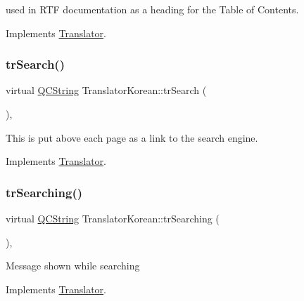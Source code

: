 used in R\+TF documentation as a heading for the Table of Contents. 

Implements \mbox{\hyperlink{class_translator}{Translator}}.

\mbox{\label{class_translator_korean_af75be9d9049596f6edf949f3601121e0}} 
\subsubsection{\texorpdfstring{trSearch()}{trSearch()}}
{\footnotesize\ttfamily virtual \mbox{\hyperlink{class_q_c_string}{Q\+C\+String}} Translator\+Korean\+::tr\+Search (\begin{DoxyParamCaption}{ }\end{DoxyParamCaption})\hspace{0.3cm}{\ttfamily [inline]}, {\ttfamily [virtual]}}

This is put above each page as a link to the search engine. 

Implements \mbox{\hyperlink{class_translator}{Translator}}.

\mbox{\label{class_translator_korean_a60b48444c1dd59762c5b3930204987db}} 
\subsubsection{\texorpdfstring{trSearching()}{trSearching()}}
{\footnotesize\ttfamily virtual \mbox{\hyperlink{class_q_c_string}{Q\+C\+String}} Translator\+Korean\+::tr\+Searching (\begin{DoxyParamCaption}{ }\end{DoxyParamCaption})\hspace{0.3cm}{\ttfamily [inline]}, {\ttfamily [virtual]}}

Message shown while searching 

Implements \mbox{\hyperlink{class_translator}{Translator}}.

\mbox{\label{class_translator_korean_a14a41f288f48978a6c8c193494818f32}} 
